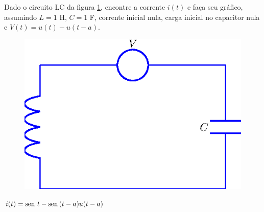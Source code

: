 \begin{exer}
Dado o circuito LC da figura \ref{circ_2}, encontre a corrente $i(t)$ e faça seu gráfico, assumindo $L = 1$ H, $C = 1$ F, corrente inicial nula, carga inicial no capacitor nula e $V(t) = u(t) - u(t-a)$.
\begin{figure}[!ht]
\begin{center}

\includegraphics{cap_dirac_conv/pics/figura_15}\end{center}
\caption{\label{circ_2}}
\end{figure}
\end{exer}
\begin{resp}
 $\displaystyle i(t) = \operatorname{sen}\, t - \operatorname{sen}\,(t-a) u(t-a)$
\end{resp}
